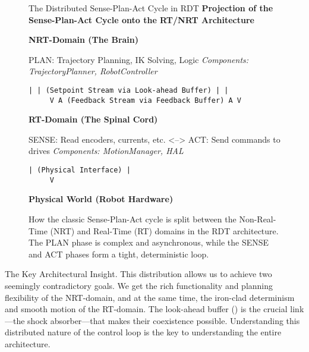 \begin{figure}[htbp!] %
    \centering
    \begin{infobox}{The Distributed Sense-Plan-Act Cycle in RDT} %
        \textbf{Projection of the Sense-Plan-Act Cycle onto the RT/NRT Architecture}
        
        \textbf{NRT-Domain (The Brain)}
        \begin{infobox}{PLAN: Trajectory Planning, IK Solving, Logic} %
            \textit{Components: TrajectoryPlanner, RobotController}
        \end{infobox}
        
        \begin{lstlisting}[language=Text, basicstyle=\ttfamily\scriptsize, columns=fixed, frame=none, numbers=none, showstringspaces=false, breaklines=false, breakatwhitespace=false, aboveskip=0.0cm, belowskip=0.0cm]
     | | (Setpoint Stream via Look-ahead Buffer) | |
     V A (Feedback Stream via Feedback Buffer) A V
        \end{lstlisting}
        
        \textbf{RT-Domain (The Spinal Cord)}
        \begin{infobox}{SENSE: Read encoders, currents, etc. <--> ACT: Send commands to drives} %
            \textit{Components: MotionManager, HAL}
        \end{infobox}
        
        \begin{lstlisting}[language=Text, basicstyle=\ttfamily\scriptsize, columns=fixed, frame=none, numbers=none, showstringspaces=false, breaklines=false, breakatwhitespace=false, aboveskip=0.0cm, belowskip=0.0cm]
     | (Physical Interface) |
     V
        \end{lstlisting}
        
        \textbf{Physical World (Robot Hardware)}
    \end{infobox}
    \caption{How the classic Sense-Plan-Act cycle is split between the Non-Real-Time (NRT) and Real-Time (RT) domains in the RDT architecture. The PLAN phase is complex and asynchronous, while the SENSE and ACT phases form a tight, deterministic loop.}
    \label{fig:distributed_cycle}
\end{figure}

\begin{principlebox}{The Key Architectural Insight.}
    This distribution allows us to achieve two seemingly contradictory goals. We get the rich functionality and planning flexibility of the NRT-domain, and at the same time, the iron-clad determinism and smooth motion of the RT-domain. The look-ahead buffer () is the crucial link—the shock absorber—that makes their coexistence possible. Understanding this distributed nature of the control loop is the key to understanding the entire architecture.
\end{principlebox}

